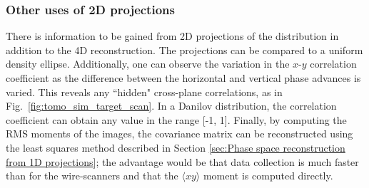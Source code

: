 \subsubsection{Other uses of 2D projections}

There is information to be gained from 2D projections of the distribution in addition to the 4D reconstruction. The projections can be compared to a uniform density ellipse. Additionally, one can observe the variation in the $x$-$y$ correlation coefficient as the difference between the horizontal and vertical phase advances is varied. This reveals any ``hidden" cross-plane correlations, as in Fig.~\ref{fig:tomo_sim_target_scan}. In a Danilov distribution, the correlation coefficient can obtain any value in the range [-1, 1]. Finally, by computing the RMS moments of the images, the covariance matrix can be reconstructed using the least squares method described in Section \ref{sec:Phase space reconstruction from 1D projections}; the advantage would be that data collection is much faster than for the wire-scanners and that the $\langle xy \rangle$ moment is computed directly.